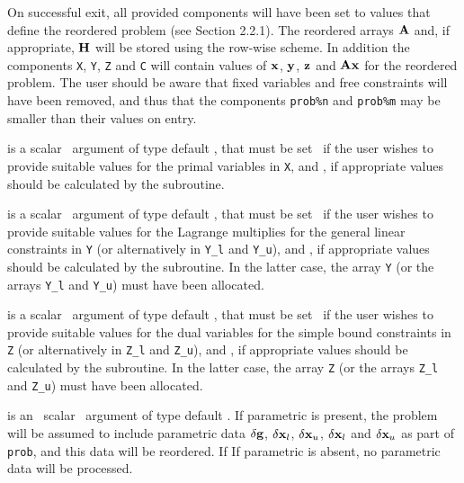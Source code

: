 \documentclass{galahad}
\begin{document}
\begin{description}

On successful exit, all provided components will have been set to values 
that define the reordered problem (see Section 2.2.1). The reordered 
arrays ${\mathbf{A}}$ and, if appropriate,  ${\mathbf{H}}$ will be stored using the row-wise
scheme. In addition the components
{\tt X}, {\tt Y}, {\tt Z} and {\tt C} will contain values of 
${\mathbf{x}}$, ${\mathbf{y}}$, ${\mathbf{z}}$ and ${\mathbf{A}} {\mathbf{x}}$ for the reordered problem. 
The user should be aware that fixed variables and free constraints will have 
been removed, and thus that the components {\tt prob\%n} and {\tt prob\%m} 
may be smaller than their values on entry. 

 is a scalar \intentin\ argument of type default \logical, that 
must be set \false\ if the user wishes to provide suitable values for the 
primal variables in {\tt X}, and \true, if appropriate values should be 
calculated by the subroutine. 
 
 is a scalar \intentin\ argument of type default \logical, that 
must be set \false\ if the user wishes to provide suitable values for the 
Lagrange multiplies for the general linear constraints in {\tt Y}
(or alternatively in {\tt Y\_l} and {\tt Y\_u}), 
and \true, if appropriate values should be calculated by the subroutine. 
In the latter case, the array {\tt Y} (or the arrays {\tt Y\_l} and {\tt Y\_u})
must have been allocated.
 
 is a scalar \intentin\ argument of type default \logical, that 
must be set \false\ if the user wishes to provide suitable values for the 
dual variables for the simple bound constraints in {\tt Z}
(or alternatively in {\tt Z\_l} and {\tt Z\_u}), and \true, 
if appropriate values should be calculated by the subroutine. 
In the latter case, the array {\tt Z} (or the arrays {\tt Z\_l} and {\tt Z\_u})
must have been allocated.

is an \optional\ scalar \intentin\ argument of type default \logical. 
If {parametric} is present, the problem will be assumed to include
parametric data $\delta {\mathbf{g}}$, $\delta {\mathbf{x}}_l$, $\delta {\mathbf{x}}_u$, 
$\delta {\mathbf{x}}_l$ and $\delta {\mathbf{x}}_u$ as part of {\tt prob},
and this data will be reordered. If 
If {parametric} is absent, no parametric data will be processed.
 
\end{description}
\end{document}
